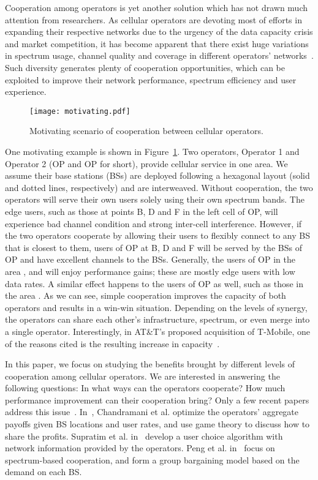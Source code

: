 \documentclass[conference]{IEEEtran}
\begin{document}
Cooperation among operators is yet another solution which has not drawn much attention from researchers. As cellular operators are devoting most of efforts in expanding their respective networks due to the urgency of the data capacity crisis and market competition, it has become apparent that there exist huge variations in spectrum usage, channel quality and coverage in different operators' networks~\cite{CoverageData}. Such diversity generates plenty of cooperation opportunities, which can be exploited to improve their network performance, spectrum efficiency and user experience.

\begin{figure}[htbp]
    \centerline{\texttt{[image: motivating.pdf]}}
    \caption{
       Motivating scenario of cooperation between cellular operators.
    }
    \label{fig:motivatingexample}
\vspace{-0.25in}
\end{figure}
One motivating example is shown in Figure~\ref{fig:motivatingexample}. Two operators, Operator 1 and Operator 2 (OP and OP for short), provide cellular service in one area. We assume their base stations (BSs) are deployed following a hexagonal layout (solid and dotted lines, respectively) and are interweaved. Without cooperation, the two operators will serve their own users solely using their own spectrum bands. The edge users, such as those at points B, D and F in the left cell of OP, will experience bad channel condition and strong inter-cell interference. However, if the two operators cooperate by allowing their users to flexibly connect to any BS that is closest to them, users of OP at B, D and F will be served by the BSs of OP and have excellent channels to the BSs. Generally, the users of OP in the area ,  and  will enjoy performance gains; these are mostly edge users with low data rates. A similar effect happens to the users of OP as well, such as those in the area . As we can see, simple cooperation improves the capacity of both operators and results in a win-win situation. Depending on the levels of synergy, the operators can share each other's infrastructure, spectrum, or even merge into a single operator. Interestingly, in AT\&T's proposed acquisition of T-Mobile, one of the reasons cited is the resulting increase in capacity~\cite{FCCMerger11}.

In this paper, we focus on studying the benefits brought by different levels of cooperation among cellular operators. We are interested in answering the following questions: In what ways can the operators cooperate? How much performance improvement can their cooperation bring? Only a few recent papers address this issue~\cite{Singh@TON11}\cite{Supratim@MOBICOM11}\cite{Peng@WC10}. In~\cite{Singh@TON11}, Chandramani et al. optimize the operators' aggregate payoffs given BS locations and user rates, and use game theory to discuss how to share the profits. Supratim et al. in~\cite{Supratim@MOBICOM11} develop a user choice algorithm with network information provided by the operators. Peng et al. in~\cite{Peng@WC10} focus on spectrum-based cooperation, and form a group bargaining model based on the demand on each BS.
\end{document}
